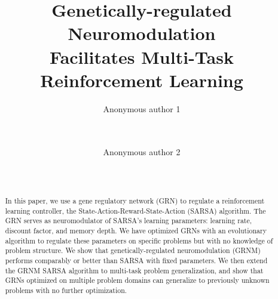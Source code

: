 \documentclass{sig-alternate-2}
\title{Genetically-regulated Neuromodulation\\
    Facilitates Multi-Task Reinforcement Learning}
\author{
\alignauthor
Anonymous author 1\\
\affaddr{Anonymous address 1}\\
\affaddr{Anonymous address 1} \\
\affaddr{Anonymous address 1}
\email{Anonymous email 1}
\and
\alignauthor
Anonymous author 2\\
\affaddr{Anonymous address 2}\\
\affaddr{Anonymous address 2} \\
\affaddr{Anonymous address 2}
\email{Anonymous email 2}
}
\date{}
\begin{document}
\maketitle

\begin{abstract}
In this paper, we use a gene regulatory network (GRN) to regulate a reinforcement learning controller, the State-Action-Reward-State-Action (SARSA) algorithm. The GRN serves as neuromodulator of SARSA's learning parameters: learning rate, discount factor, and memory depth. We have optimized GRNs with an evolutionary algorithm to regulate these parameters on specific problems but with no knowledge of problem structure. We show that genetically-regulated neuromodulation (GRNM) performs comparably or better than SARSA with fixed parameters. We then extend the GRNM SARSA algorithm to multi-task problem generalization, and show that GRNs optimized on multiple problem domains can generalize to previously unknown problems with no further optimization. 
\end{abstract}

















\end{document}
